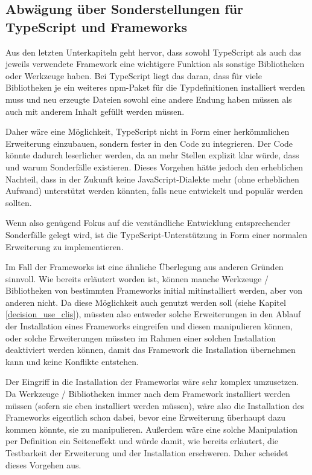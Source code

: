 \subsection{Abwägung über Sonderstellungen für TypeScript und Frameworks}
Aus den letzten Unterkapiteln geht hervor, dass sowohl TypeScript als auch das jeweils verwendete Framework eine wichtigere Funktion als sonstige Bibliotheken oder Werkzeuge haben. Bei TypeScript liegt das daran, dass für viele Bibliotheken je ein weiteres \gls{npm}-Paket für die Typdefinitionen installiert werden muss und neu erzeugte Dateien sowohl eine andere Endung haben müssen als auch mit anderem Inhalt gefüllt werden müssen.

Daher wäre eine Möglichkeit, TypeScript nicht in Form einer herkömmlichen Erweiterung einzubauen, sondern fester in den Code zu integrieren. Der Code könnte dadurch leserlicher werden, da an mehr Stellen explizit klar würde, dass und warum Sonderfälle existieren. Dieses Vorgehen hätte jedoch den erheblichen Nachteil, dass in der Zukunft keine JavaScript-Dialekte mehr (ohne erheblichen Aufwand) unterstützt werden könnten, falls neue entwickelt und populär werden sollten.

Wenn also genügend Fokus auf die verständliche Entwicklung entsprechender Sonderfälle gelegt wird, ist die TypeScript-Unterstützung in Form einer normalen Erweiterung zu implementieren.

Im Fall der Frameworks ist eine ähnliche Überlegung aus anderen Gründen sinnvoll. Wie bereits erläutert worden ist, können manche Werkzeuge / Bibliotheken von bestimmten Frameworks initial mitinstalliert werden, aber von anderen nicht. Da diese Möglichkeit auch genutzt werden soll (siehe Kapitel \ref{decision_use_clis}), müssten also entweder solche Erweiterungen in den Ablauf der Installation eines Frameworks eingreifen und diesen manipulieren können, oder solche Erweiterungen müssten im Rahmen einer solchen Installation deaktiviert werden können, damit das Framework die Installation übernehmen kann und keine Konflikte entstehen.

Der Eingriff in die Installation der Frameworks wäre sehr komplex umzusetzen. Da Werkzeuge / Bibliotheken immer nach dem Framework installiert werden müssen (sofern sie eben installiert werden müssen), wäre also die Installation des Frameworks eigentlich schon dabei, bevor eine Erweiterung überhaupt dazu kommen könnte, sie zu manipulieren. Außerdem wäre eine solche Manipulation per Definition ein Seiteneffekt und würde damit, wie bereits erläutert, die Testbarkeit der Erweiterung und der Installation erschweren. Daher scheidet dieses Vorgehen aus.

